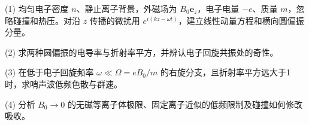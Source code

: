 (1) 均匀电子密度 \(n\)、静止离子背景，外磁场为 \(B_0\mathbf e_z\)，电子电量 \(-e\)、质量 \(m\)，忽略碰撞和热压。对沿 \(z\) 传播的微扰用 \(e^{i(kz-\omega t)}\)，建立线性动量方程和横向圆偏振分量。

(2) 求两种圆偏振的电导率与折射率平方，并辨认电子回旋共振处的奇性。

(3) 在低于电子回旋频率 \(\omega\ll\Omega=eB_0/m\) 的右旋分支，且折射率平方远大于1时，求哨声波低频色散与群速。

(4) 分析 \(B_0\to0\) 的无磁等离子体极限、固定离子近似的低频限制及碰撞如何修改吸收。
